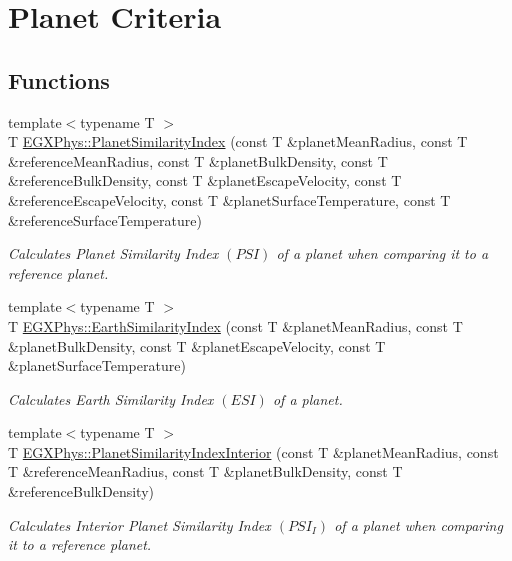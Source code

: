 \hypertarget{group___e_g_x_phys-_planet_criteria}{}\section{Planet Criteria}
\label{group___e_g_x_phys-_planet_criteria}
\subsection*{Functions}
\begin{DoxyCompactItemize}
\item 
{\footnotesize template$<$typename T $>$ }\\T \mbox{\hyperlink{group___e_g_x_phys-_planet_criteria_ga62e8b781c301df60bd04af3183a965eb}{E\+G\+X\+Phys\+::\+Planet\+Similarity\+Index}} (const T \&planet\+Mean\+Radius, const T \&reference\+Mean\+Radius, const T \&planet\+Bulk\+Density, const T \&reference\+Bulk\+Density, const T \&planet\+Escape\+Velocity, const T \&reference\+Escape\+Velocity, const T \&planet\+Surface\+Temperature, const T \&reference\+Surface\+Temperature)
\begin{DoxyCompactList}\small\item\em Calculates Planet Similarity Index $(PSI)$ of a planet when comparing it to a reference planet. \end{DoxyCompactList}\item 
{\footnotesize template$<$typename T $>$ }\\T \mbox{\hyperlink{group___e_g_x_phys-_planet_criteria_ga4b86397b1c839c49ac599d49fda207d4}{E\+G\+X\+Phys\+::\+Earth\+Similarity\+Index}} (const T \&planet\+Mean\+Radius, const T \&planet\+Bulk\+Density, const T \&planet\+Escape\+Velocity, const T \&planet\+Surface\+Temperature)
\begin{DoxyCompactList}\small\item\em Calculates Earth Similarity Index $(ESI)$ of a planet. \end{DoxyCompactList}\item 
{\footnotesize template$<$typename T $>$ }\\T \mbox{\hyperlink{group___e_g_x_phys-_planet_criteria_ga6dc06a1a8baf6e132abed51fcf410c7f}{E\+G\+X\+Phys\+::\+Planet\+Similarity\+Index\+Interior}} (const T \&planet\+Mean\+Radius, const T \&reference\+Mean\+Radius, const T \&planet\+Bulk\+Density, const T \&reference\+Bulk\+Density)
\begin{DoxyCompactList}\small\item\em Calculates Interior Planet Similarity Index $(PSI_I)$ of a planet when comparing it to a reference planet. \end{DoxyCompactList}\item 

\end{DoxyCompactItemize}
